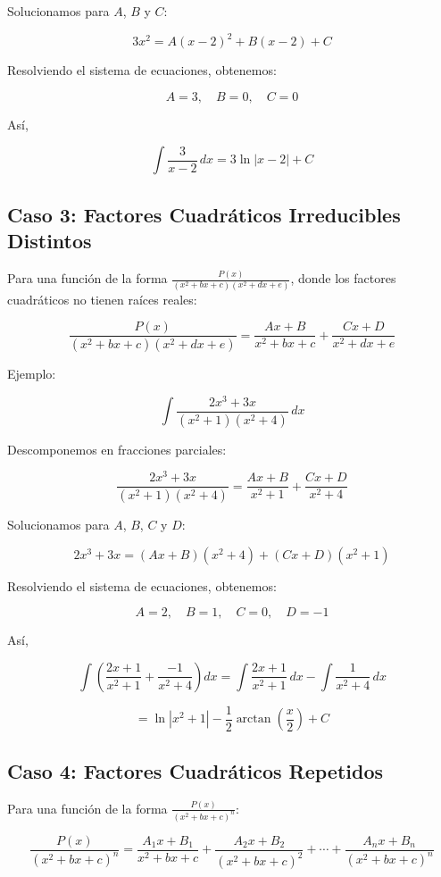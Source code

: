 Solucionamos para \(A\), \(B\) y \(C\):

\[
3x^2 = A(x-2)^2 + B(x-2) + C
\]

Resolviendo el sistema de ecuaciones, obtenemos:

\[
A = 3, \quad B = 0, \quad C = 0
\]

Así,

\[
\int \frac{3}{x-2} \, dx = 3 \ln|x-2| + C
\]

\subsection*{Caso 3: Factores Cuadráticos Irreducibles Distintos}

Para una función de la forma \(\frac{P(x)}{(x^2 + bx + c)(x^2 + dx + e)}\), donde los factores cuadráticos no tienen raíces reales:

\[
\frac{P(x)}{(x^2 + bx + c)(x^2 + dx + e)} = \frac{Ax + B}{x^2 + bx + c} + \frac{Cx + D}{x^2 + dx + e}
\]

Ejemplo:

\[
\int \frac{2x^3 + 3x}{(x^2 + 1)(x^2 + 4)} \, dx
\]

Descomponemos en fracciones parciales:

\[
\frac{2x^3 + 3x}{(x^2 + 1)(x^2 + 4)} = \frac{Ax + B}{x^2 + 1} + \frac{Cx + D}{x^2 + 4}
\]

Solucionamos para \(A\), \(B\), \(C\) y \(D\):

\[
2x^3 + 3x = (Ax + B)(x^2 + 4) + (Cx + D)(x^2 + 1)
\]

Resolviendo el sistema de ecuaciones, obtenemos:

\[
A = 2, \quad B = 1, \quad C = 0, \quad D = -1
\]

Así,

\[
\int \left( \frac{2x + 1}{x^2 + 1} + \frac{-1}{x^2 + 4} \right) dx = \int \frac{2x + 1}{x^2 + 1} \, dx - \int \frac{1}{x^2 + 4} \, dx
\]

\[
= \ln|x^2 + 1| - \frac{1}{2} \arctan\left(\frac{x}{2}\right) + C
\]

\subsection*{Caso 4: Factores Cuadráticos Repetidos}

Para una función de la forma \(\frac{P(x)}{(x^2 + bx + c)^n}\):

\[
\frac{P(x)}{(x^2 + bx + c)^n} = \frac{A_1x + B_1}{x^2 + bx + c} + \frac{A_2x + B_2}{(x^2 + bx + c)^2} + \cdots + \frac{A_nx + B_n}{(x^2 + bx + c)^n}
\]

